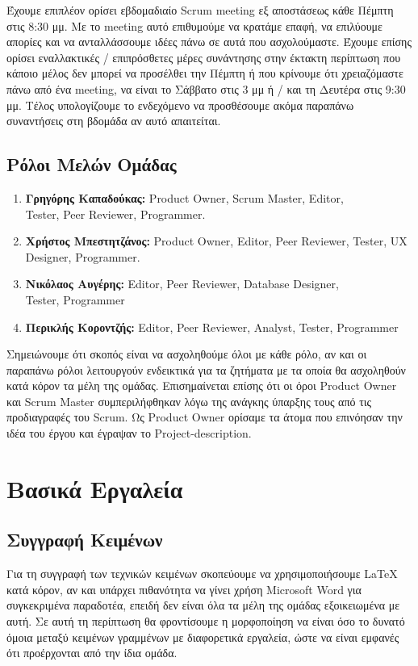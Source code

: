 \documentclass[12pt,a4paper]{article}
\begin{document}
Έχουμε επιπλέον ορίσει εβδομαδιαίο Scrum meeting εξ αποστάσεως κάθε Πέμπτη στις 8:30 μμ. Με το meeting αυτό επιθυμούμε να κρατάμε επαφή, να επιλύουμε απορίες και να ανταλλάσσουμε ιδέες πάνω σε αυτά που ασχολούμαστε. Έχουμε επίσης ορίσει εναλλακτικές / επιπρόσθετες μέρες συνάντησης στην έκτακτη περίπτωση που κάποιο μέλος δεν μπορεί να προσέλθει την Πέμπτη ή που κρίνουμε ότι χρειαζόμαστε πάνω από ένα meeting, να είναι το Σάββατο στις 3 μμ ή / και τη Δευτέρα στις 9:30 μμ. Τέλος υπολογίζουμε το ενδεχόμενο να προσθέσουμε ακόμα παραπάνω συναντήσεις στη βδομάδα αν αυτό απαιτείται.

\subsection{Ρόλοι Μελών Ομάδας}

\begin{enumerate}
	\item \textbf{Γρηγόρης Καπαδούκας:} Product Owner, Scrum Master, Editor,\\ Tester, Peer Reviewer, Programmer.
	\item \textbf{Χρήστος Μπεστητζάνος:} Product Owner, Editor, Peer Reviewer, Tester, UX Designer, Programmer.
	\item \textbf{Νικόλαος Αυγέρης:} Editor, Peer Reviewer, Database Designer,\\ Tester, Programmer
	\item \textbf{Περικλής Κοροντζής:} Editor, Peer Reviewer, Analyst, Tester, Programmer
\end{enumerate}

Σημειώνουμε ότι σκοπός είναι να ασχοληθούμε όλοι με κάθε ρόλο, αν και οι παραπάνω ρόλοι λειτουργούν ενδεικτικά για τα ζητήματα με τα οποία θα ασχοληθούν κατά κόρον τα μέλη της ομάδας. Επισημαίνεται επίσης ότι οι όροι Product Owner και Scrum Master συμπεριλήφθηκαν λόγω της ανάγκης ύπαρξης τους από τις προδιαγραφές του Scrum. Ως Product Owner ορίσαμε τα άτομα που επινόησαν την ιδέα του έργου και έγραψαν το Project-description.

\section{Βασικά Εργαλεία}

\subsection{Συγγραφή Κειμένων}
Για τη συγγραφή των τεχνικών κειμένων σκοπεύουμε να χρησιμοποιήσουμε LaTeX κατά κόρον, αν και υπάρχει πιθανότητα να γίνει χρήση Microsoft Word για συγκεκριμένα παραδοτέα, επειδή δεν είναι όλα τα μέλη της ομάδας εξοικειωμένα με αυτή. Σε αυτή τη περίπτωση θα φροντίσουμε η μορφοποίηση να είναι όσο το δυνατό όμοια μεταξύ κειμένων γραμμένων με διαφορετικά εργαλεία, ώστε να είναι εμφανές ότι προέρχονται από την ίδια ομάδα.
\end{document}
